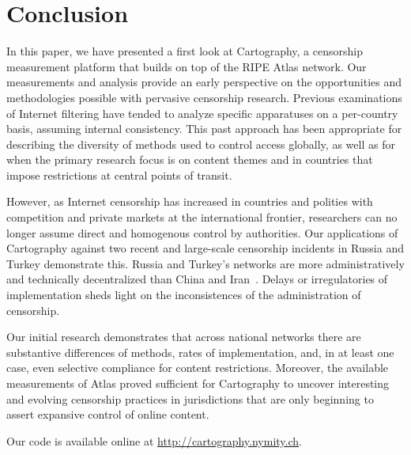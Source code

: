\section{Conclusion}
\label{sec:conclusion}

In this paper, we have presented a first look at \textsf{Cartography}, a censorship measurement platform that builds on top of the RIPE Atlas network.  Our measurements and analysis provide an early perspective on the opportunities and methodologies possible with pervasive censorship research. Previous examinations of Internet filtering have tended to analyze specific apparatuses on a per-country basis, assuming internal consistency. This past approach has been appropriate for describing the diversity of methods used to control access globally, as well as for when the primary research focus is on content themes and in countries that impose restrictions at central points of transit. 

However, as Internet censorship has increased in countries and polities with competition and private markets at the international frontier, researchers can no longer assume direct and homogenous control by authorities. Our applications of Cartography against two recent and
large-scale censorship incidents in Russia and Turkey demonstrate this. Russia and Turkey's networks are more administratively and technically decentralized than China and Iran~\cite{Roberts2011}. Delays or irregulatories of implementation sheds light on the inconsistences of the administration of censorship. 

Our initial research demonstrates that across national networks there are
substantive differences of methods, rates of implementation, and, in at least
one case, even selective compliance for content restrictions. Moreover, the
available measurements of Atlas proved sufficient for Cartography to uncover
interesting and evolving censorship practices in jurisdictions that are only
beginning to assert expansive control of online content. %

Our code is available online at \url{http://cartography.nymity.ch}.


